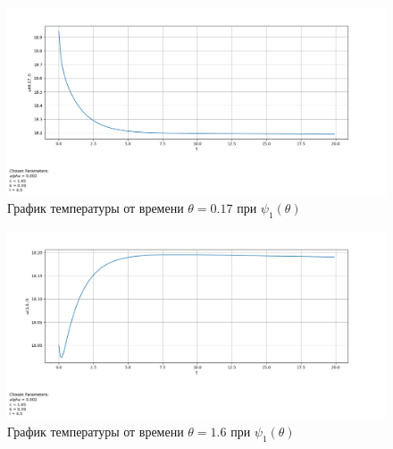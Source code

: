 {{\begin{figure}[H]
    \centering                             
	\includegraphics[width=\textwidth,height=\textheight,keepaspectratio]{kir/var_1_z_0t17.png}                 
	\centering\caption{ График температуры от времени $\theta=0.17$ при $\psi_1(\theta)$}
	\label{grapics7}                           
\end{figure}               

\begin{figure}[H]
    \centering                             
	\includegraphics[width=\textwidth,height=\textheight,keepaspectratio]{kir/var_1_z_1t6.png}                 
	\caption{ График температуры от времени $\theta=1.6$ при $\psi_1(\theta)$}
	\label{grapics8}                           
\end{figure}                                  

}}
